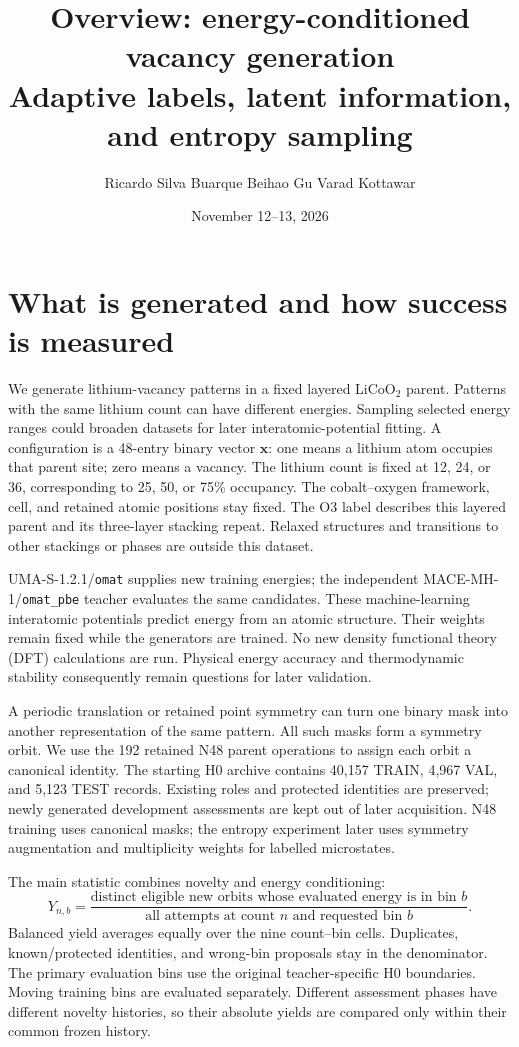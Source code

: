 \documentclass[11pt]{article}
\title{Overview: energy-conditioned vacancy generation\\
\large Adaptive labels, latent information, and entropy sampling}
\author{Ricardo Silva Buarque \quad Beihao Gu \quad Varad Kottawar}
\date{November 12--13, 2026}
\begin{document}
\maketitle


\section{What is generated and how success is measured}
We generate lithium-vacancy patterns in a fixed layered LiCoO$_2$ parent.
Patterns with the same lithium count can have different energies. Sampling
selected energy ranges could broaden datasets for later interatomic-potential fitting.
A configuration is a 48-entry binary vector $\mathbf x$: one means a lithium
atom occupies that parent site; zero means a vacancy. The lithium count is
fixed at 12, 24, or 36, corresponding to 25, 50, or 75\% occupancy. The
cobalt--oxygen framework, cell, and retained atomic positions stay fixed.
The O3 label describes this layered parent and its three-layer stacking
repeat. Relaxed structures and transitions to other stackings or phases are
outside this dataset.

UMA-S-1.2.1/\texttt{omat} \cite{uma} supplies new training energies; the
independent MACE-MH-1/\texttt{omat\_pbe} teacher \cite{macefoundation} evaluates
the same candidates. These machine-learning interatomic potentials predict
energy from an atomic structure. Their weights remain fixed while the
generators are trained. No new density functional theory (DFT) calculations
are run. Physical energy accuracy and thermodynamic stability consequently
remain questions for later validation.

A periodic translation or retained point symmetry can turn one binary mask
into another representation of the same pattern. All such masks form a
symmetry orbit. We use the 192 retained N48 parent operations to assign each
orbit a canonical identity. The starting H0 archive contains 40,157 TRAIN,
4,967 VAL, and 5,123 TEST records. Existing roles and protected identities
are preserved; newly generated development assessments are kept out of
later acquisition. N48 training uses canonical masks; the entropy experiment
later uses symmetry augmentation and multiplicity weights for labelled microstates.

The main statistic combines novelty and energy conditioning:
\begin{equation}
Y_{n,b}=\frac{\text{distinct eligible new orbits whose evaluated energy is in bin }b}
                  {\text{all attempts at count }n\text{ and requested bin }b}.
\end{equation}
Balanced yield averages equally over the nine count--bin cells. Duplicates,
known/protected identities, and wrong-bin proposals stay in the denominator.
The primary evaluation bins use the original teacher-specific H0 boundaries.
Moving training bins are evaluated separately. Different assessment phases
have different novelty histories, so their absolute yields are compared only
within their common frozen history.
\end{document}
